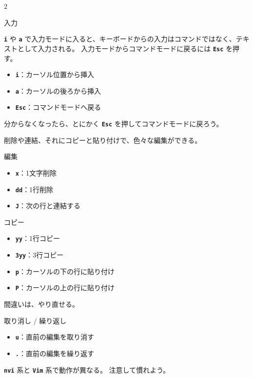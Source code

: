 \begin{multicols}{2}
\begin{cheatbox}{入力}
\begin{small}
\texttt{\bfseries i} や \texttt{\bfseries a} で入力モードに入ると、キーボードからの入力はコマンドではなく、テキストとして入力される。
入力モードからコマンドモードに戻るには \texttt{\bfseries Esc} を押す。
\end{small}
\begin{itemize}
  \item \texttt{\bfseries i}：カーソル位置から挿入
  \item \texttt{\bfseries a}：カーソルの後ろから挿入
  \item \texttt{\bfseries Esc}：コマンドモードへ戻る
\end{itemize}
\begin{small}
分からなくなったら、とにかく \texttt{\bfseries Esc} を押してコマンドモードに戻ろう。
\end{small}
\end{cheatbox}

削除や連結、それにコピーと貼り付けで、色々な編集ができる。

\begin{cheatbox}{編集}
\begin{itemize}
  \item \texttt{\bfseries x}：1文字削除
  \item \texttt{\bfseries dd}：1行削除
  \item \texttt{\bfseries J}：次の行と連結する
\end{itemize}
\end{cheatbox}

\begin{cheatbox}{コピー}
\begin{itemize}
  \item \texttt{\bfseries yy}：1行コピー
  \item \texttt{\bfseries 3yy}：3行コピー
  \item \texttt{\bfseries p}：カーソルの下の行に貼り付け
  \item \texttt{\bfseries P}：カーソルの上の行に貼り付け
\end{itemize}
\end{cheatbox}

間違いは、やり直せる。

\begin{cheatbox}{取り消し / 繰り返し}
\begin{itemize}
  \item \texttt{\bfseries u}：直前の編集を取り消す
  \item \texttt{\bfseries .}：直前の編集を繰り返す
\end{itemize}
\texttt{\bfseries nvi} 系と \texttt{\bfseries Vim} 系で動作が異なる。
注意して慣れよう。
\end{cheatbox}

\end{multicols}




